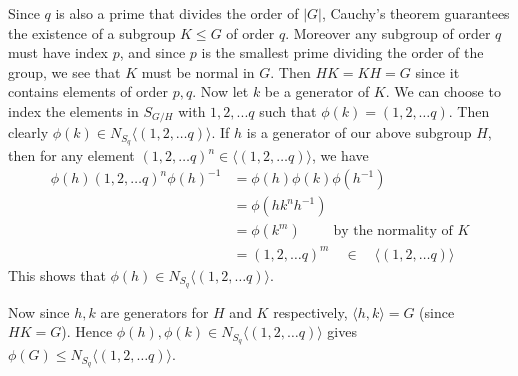 \documentclass[12pt]{exam}
\theoremstyle{plain} %
\theoremstyle{definition} %
\theoremstyle{remark} %
\begin{document}
\begin{questions}
\begin{solution}
  Since $q$ is also a prime that divides the order of $|G|$,
  Cauchy's theorem guarantees the existence of a subgroup $K
  \leqslant G$ of order
  $q$. Moreover any subgroup of order $q$ must have index $p$,
  and since $p$ is the smallest prime dividing the order of the group, we
  see that $K$ must be normal in $G$. Then $HK = KH = G$ since it
  contains elements of order $p, q$. Now let $k$ be a generator
  of $K$. We can choose to index the elements in $S_{G/H}$ with $1,
  2, ... q$ such that $\phi(k) = (1, 2, \ldots q)$. Then clearly
  $\phi(k) \in N_{S_q}\langle (1, 2, \ldots q)\rangle$. If $h$ is a
  generator of our above subgroup $H$, then for any element $(1, 2,
  \ldots q)^n \in \langle (1,2, \ldots q) \rangle $, we have
  \begin{align*}
    \phi(h)(1, 2, \ldots q)^n\phi(h)^{-1} &= \phi(h)\phi(k)\phi(h^{-1}) \\
    &= \phi(hk^nh^{-1}) \\
    &= \phi(k^m) \quad \quad \textrm{ by the normality of }  K \\
    &= (1, 2, \ldots q)^m  \quad \in \quad \langle (1, 2, \ldots q)  \rangle
  \end{align*}
  This shows that $\phi(h) \in N_{S_q}\langle (1, 2, \ldots q)  \rangle$.
\end{solution}
Now since $h, k$ are generators for $H$ and $K$ respectively,
$\langle  h , k \rangle = G$ (since $HK = G$). Hence $\phi(h), \phi(k)
\in N_{ S_q}\langle (1, 2, \ldots q)\rangle$ gives $\phi(G)
\leqslant N_{S_q}\langle (1, 2, \ldots q)\rangle$.

\end{questions}
\printbibliography[heading=bibintoc]
\end{document}
